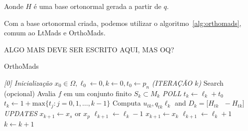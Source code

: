 Aonde $H$ é uma base ortonormal gerada a partir de $q$.

Com a base ortonormal criada, podemos utilizar o algoritmo~\ref{alg:orthomads}, comum ao LtMads e OrthoMads.

ALGO MAIS DEVE SER ESCRITO AQUI, MAS OQ?


\begin{algorithm}
    \caption{OrthoMads}
    \label{alg:orthomads}
    \begin{algorithmic}[1] %
\BState \emph{[0] Inicialização}   
                \State $x_0 \in \Omega , \ell_0 \gets 0, k \gets 0, t_0 \gets p_n$ 
\BState \emph{(ITERAÇÃO $k$)}                
            \State Search (opcional)
			\State Avalia $ f $ em um conjunto finito $S_k \subset M_k $
\State \emph{POLL}
    \State $t_k \gets \ell_k + t_0$
    \State $t_k \gets 1 + \text{max} \{t_j:j=0,1,\dots,k-1\}$
    \EndIf
    \State Computa $ u_{tk} , q_{tk}   \ell_k $ and $ D_k = \big[ H_{tk} \text{    } -H_{tk} \big] $
\BState \emph{UPDATES}                
		\State $x_{k+1} \gets x_s $ or $x_p$
		\State $\ell_{k+1} \gets \ell_k - 1$
		\State $x_{k+1} \gets x_k$
		\State $\ell_{k+1} \gets \ell_k + 1$
    \EndIf
    \State $k \gets k + 1$
    \EndWhile
    \end{algorithmic}
\end{algorithm}



